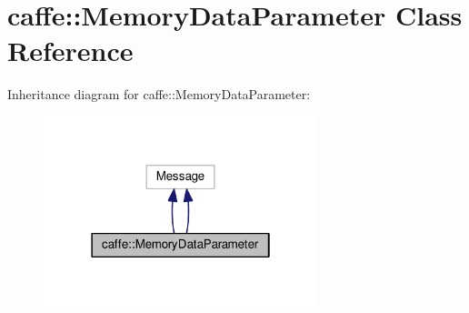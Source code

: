 \hypertarget{classcaffe_1_1_memory_data_parameter}{}\section{caffe\+:\+:Memory\+Data\+Parameter Class Reference}
\label{classcaffe_1_1_memory_data_parameter}


Inheritance diagram for caffe\+:\+:Memory\+Data\+Parameter\+:
\nopagebreak
\begin{figure}[H]
\begin{center}
\leavevmode
\includegraphics[width=226pt]{classcaffe_1_1_memory_data_parameter__inherit__graph}
\end{center}
\end{figure}
